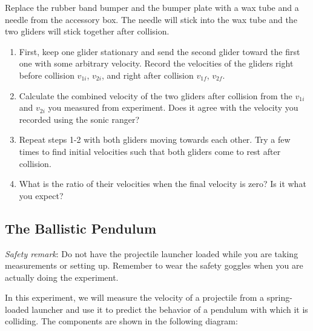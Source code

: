 Replace the rubber band bumper and the bumper plate with a wax tube and a needle from the accessory box. The needle will stick into the wax tube and the two gliders will stick together after collision.
\begin{enumerate}
\item First, keep one glider stationary and send the second glider toward the first one with some arbitrary velocity. Record the velocities of the gliders right before collision $v_{1i}$, $v_{2i}$, and right after collision $v_{1f}$, $v_{2f}$.
    \item Calculate the combined velocity of the two gliders after collision from the $v_{1i}$ and $v_{2i}$ you measured from experiment. Does it agree with the velocity you recorded using the sonic ranger?
    \item Repeat  steps 1-2 with both gliders moving towards each other. Try a few times to find initial velocities such that both gliders come to rest after collision.
\item What is the ratio of their velocities when the final velocity is zero? Is it what you expect?
\end{enumerate}



\subsection{The Ballistic Pendulum}
\emph{Safety remark}: Do not have the projectile launcher loaded while you are taking measurements or setting up. Remember to wear the safety goggles when you are actually doing the experiment.\myskip

In this experiment, we will measure the velocity of a projectile from a spring-loaded launcher and use it to predict the behavior of a pendulum with which it is colliding. The components are shown in the following diagram:

